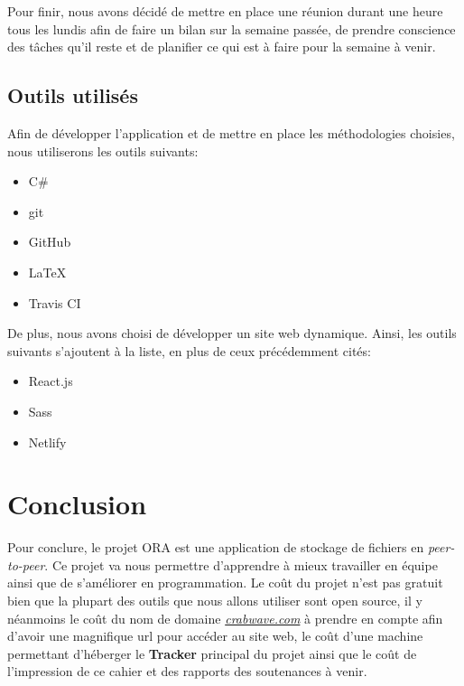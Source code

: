 \documentclass[11pt, a4paper]{specifications}
\begin{document}
Pour finir, nous avons décidé de mettre en place une réunion durant une heure tous les lundis afin de faire un bilan sur la semaine passée, de prendre conscience des tâches qu'il reste et de planifier ce qui est à faire pour la semaine à venir.

    \subsection{Outils utilisés}
Afin de développer l'application et de mettre en place les méthodologies choisies, nous utiliserons les outils suivants:
\begin{itemize}
  \item C\#
  \item git
  \item GitHub
  \item \LaTeX
  \item Travis CI
\end{itemize}
\bigbreak

De plus, nous avons choisi de développer un site web dynamique. Ainsi, les outils suivants s'ajoutent à la liste, en plus de ceux précédemment cités:
\begin{itemize}
  \item React.js
  \item Sass
  \item Netlify
\end{itemize}
 
  \section{Conclusion}
Pour conclure, le projet ORA est une application de stockage de fichiers en \textit{peer-to-peer}. Ce projet va nous permettre d'apprendre à mieux travailler en équipe ainsi que de s'améliorer en programmation.
Le coût du projet n'est pas gratuit bien que la plupart des outils que nous allons utiliser sont open source, il y néanmoins le coût du nom de domaine \textit{\href{https://crabwave.com}{crabwave.com}} à prendre en compte afin d'avoir une magnifique url pour accéder au site web, le coût d'une machine permettant d'héberger le \textbf{Tracker} principal du projet ainsi que le coût de l'impression de ce cahier et des rapports des soutenances à venir.
\end{document}
